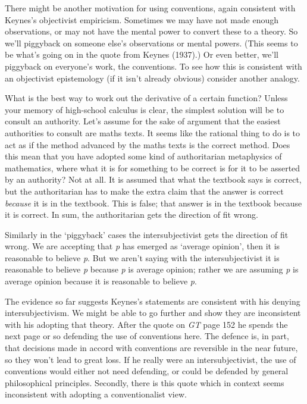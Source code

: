 \documentclass[noflushend]{philosophersimprint}
\begin{document}
There might be another motivation for using conventions, again
consistent with Keynes's objectivist empiricism. Sometimes we may have
not made enough observations, or may not have the mental power to
convert these to a theory. So we'll piggyback on someone else's
observations or mental powers. (This seems to be what's going on in the
quote from Keynes (1937).) Or even better, we'll piggyback on everyone's
work, the conventions. To see how this is consistent with an objectivist
epistemology (if it isn't already obvious) consider another analogy.

What is the best way to work out the derivative of a certain function?
Unless your memory of high-school calculus is clear, the simplest
solution will be to consult an authority. Let's assume for the sake of
argument that the easiest authorities to consult are maths texts. It
seems like the rational thing to do is to act as if the method advanced
by the maths texts is the correct method. Does this mean that you have
adopted some kind of authoritarian metaphysics of mathematics, where
what it is for something to be correct is for it to be asserted by an
authority? Not at all. It is assumed that what the textbook says is
correct, but the authoritarian has to make the extra claim that the
answer is correct \emph{because} it is in the textbook. This is false;
that answer is in the textbook because it is correct. In sum, the
authoritarian gets the direction of fit wrong.

Similarly in the `piggyback' cases the intersubjectivist gets the
direction of fit wrong. We are accepting that \emph{p} has emerged as
`average opinion', then it is reasonable to believe \emph{p}. But we
aren't saying with the intersubjectivist it is reasonable to believe
\emph{p} because \emph{p} is average opinion; rather we are assuming
\emph{p} is average opinion because it is reasonable to believe
\emph{p}.

The evidence so far suggests Keynes's statements are consistent with his
denying intersubjectivism. We might be able to go further and show they
are inconsistent with his adopting that theory. After the quote on
\emph{GT} page 152 he spends the next page or so defending the use of
conventions here. The defence is, in part, that decisions made in accord
with conventions are reversible in the near future, so they won't lead
to great loss. If he really were an intersubjectivist, the use of
conventions would either not need defending, or could be defended by
general philosophical principles. Secondly, there is this quote which in
context seems inconsistent with adopting a conventionalist view.
\end{document}
